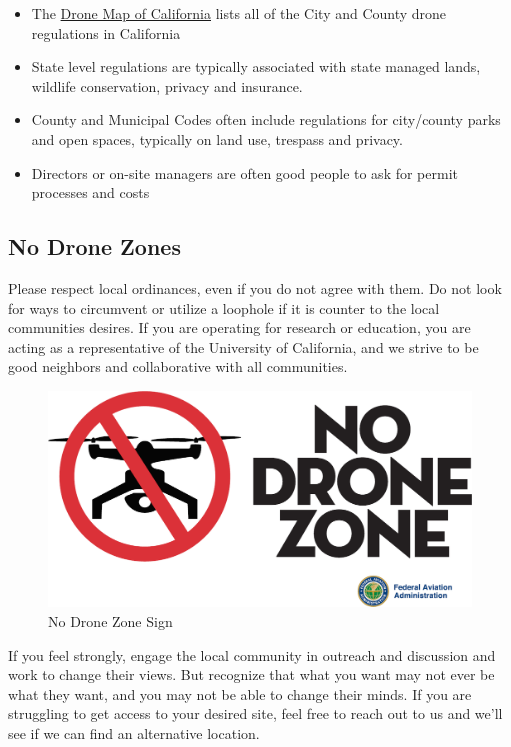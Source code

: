 \documentclass[
  12pt,
]{book}
\providecommand{\tightlist}{%
  \setlength{\itemsep}{0pt}\setlength{\parskip}{0pt}}
\begin{document}
\begin{itemize}
\tightlist
\item
  The \href{https://ucdrones.github.io/map/}{Drone Map of California} lists all of the City and County drone regulations in California
\item
  State level regulations are typically associated with state managed lands, wildlife conservation, privacy and insurance.
\item
  County and Municipal Codes often include regulations for city/county parks and open spaces, typically on land use, trespass and privacy.
\item
  Directors or on-site managers are often good people to ask for permit processes and costs
\end{itemize}

\hypertarget{no-drone-zones}{%
\subsection{No Drone Zones}\label{no-drone-zones}}

Please respect local ordinances, even if you do not agree with them. Do not look for ways to circumvent or utilize a loophole if it is counter to the local communities desires. If you are operating for research or education, you are acting as a representative of the University of California, and we strive to be good neighbors and collaborative with all communities.

\begin{figure}

{\centering \includegraphics[width=0.8\linewidth]{images/no-drone-zone} 

}

\caption{No Drone Zone Sign}\label{fig:no-drone-zone}
\end{figure}

If you feel strongly, engage the local community in outreach and discussion and work to change their views. But recognize that what you want may not ever be what they want, and you may not be able to change their minds. If you are struggling to get access to your desired site, feel free to reach out to us and we'll see if we can find an alternative location.
\end{document}
